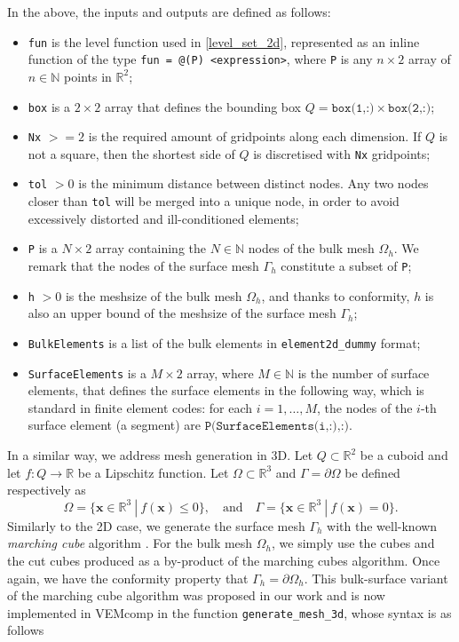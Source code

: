 \documentclass[a4paper]{article}
\newcommand{\boldx}{\boldsymbol{x}}
\begin{document}
In the above, the inputs and outputs are defined as follows:
\begin{itemize}
\item \texttt{fun} is the level function used in \eqref{level_set_2d}, represented as an inline function of the type \texttt{fun = @(P) <expression>}, where \texttt{P} is any $n\times 2$ array of $n\in\mathbb{N}$ points in $\mathbb{R}^2$;
\item \texttt{box} is a $2\times 2$ array that defines the bounding box $Q = \texttt{box(1,:)} \times \texttt{box(2,:)}$;
\item \texttt{Nx} $>= 2$ is the required amount of gridpoints along each dimension.  If $Q$ is not a square, then the shortest side of $Q$ is discretised with \texttt{Nx} gridpoints;
\item \texttt{tol} $>0$ is the minimum distance between distinct nodes.  Any two nodes closer than \texttt{tol} will be merged into a unique node, in order to avoid excessively distorted and ill-conditioned elements;
\item \texttt{P} is a $N\times 2$ array containing the $N\in\mathbb{N}$ nodes of the bulk mesh $\Omega_h$. We remark that the nodes of the surface mesh $\Gamma_h$ constitute a subset of \texttt{P};
\item \texttt{h} $>0$ is the meshsize of the bulk mesh $\Omega_h$, and thanks to conformity,  $h$ is also an upper bound of the meshsize of the surface mesh $\Gamma_h$;
\item \texttt{BulkElements} is a list of the bulk elements in \texttt{element2d\_dummy} format;
\item \texttt{SurfaceElements} is a $M\times 2$ array, where $M\in\mathbb{N}$ is the number of surface elements, that defines the surface elements in the following way, which is standard in finite element codes: for each $i=1,\dots,M$, the nodes of the $i$-th surface element (a segment) are $\texttt{P(SurfaceElements(i,:),:)}$.
\end{itemize}
In a similar way, we address mesh generation in 3D. Let $Q \subset\mathbb{R}^2$ be a cuboid and let $f: Q \rightarrow\mathbb{R}$ be a Lipschitz function.  Let $\Omega \subset\mathbb{R}^3$ and $\Gamma = \partial \Omega$ be defined respectively as
\begin{equation}
\label{level_set_3d}
\Omega = \{\boldx\in\mathbb{R}^3\ |\ f(\boldx) \le 0\}, \quad \text{and}\quad \Gamma = \{\boldx\in\mathbb{R}^3\ |\ f(\boldx) = 0\}.
\end{equation}
Similarly to the 2D case,  we generate the surface mesh $\Gamma_h$ with the well-known \emph{marching cube} algorithm \cite{lorensen1987marching}.  For the bulk mesh $\Omega_h$, we simply use the cubes and the cut cubes produced as a by-product of the marching cubes algorithm.  Once again, we have the conformity property that $\Gamma_h = \partial \Omega_h$.  This bulk-surface variant of the marching cube algorithm was proposed in our work \cite{frittelli2023elliptic} and is now implemented in VEMcomp in the function \texttt{generate\_mesh\_3d}, whose syntax is as follows
\end{document}
